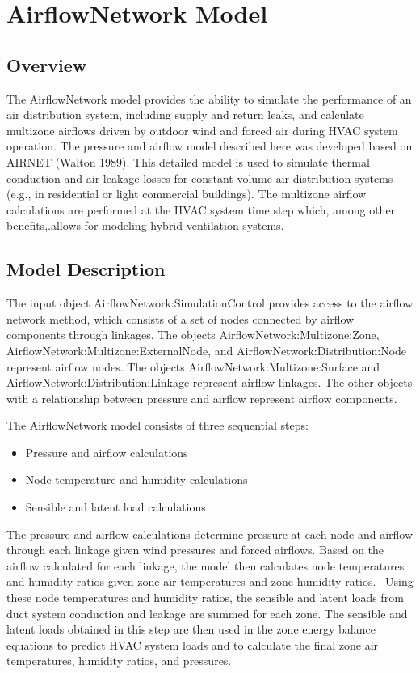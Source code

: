 \section{AirflowNetwork Model}\label{airflownetwork-model}

\subsection{Overview}\label{overview-004}

The AirflowNetwork model provides the ability to simulate the performance of an air distribution system, including supply and return leaks, and calculate multizone airflows driven by outdoor wind and forced air during HVAC system operation. The pressure and airflow model described here was developed based on AIRNET (Walton 1989). This detailed model is used to simulate thermal conduction and air leakage losses for constant volume air distribution systems (e.g., in residential or light commercial buildings). The multizone airflow calculations are performed at the HVAC system time step which, among other benefits,.allows for modeling hybrid ventilation systems.

\subsection{Model Description}\label{model-description-001}

The input object AirflowNetwork:SimulationControl provides access to the airflow network method, which consists of a set of nodes connected by airflow components through linkages. The objects AirflowNetwork:Multizone:Zone,~ AirflowNetwork:Multizone:ExternalNode, and AirflowNetwork:Distribution:Node represent airflow nodes. The objects AirflowNetwork:Multizone:Surface and AirflowNetwork:Distribution:Linkage represent airflow linkages. The other objects with a relationship between pressure and airflow represent airflow components.

The AirflowNetwork model consists of three sequential steps:

\begin{itemize}
\item
  Pressure and airflow calculations
\item
  Node temperature and humidity calculations
\item
  Sensible and latent load calculations
\end{itemize}

The pressure and airflow calculations determine pressure at each node and airflow through each linkage given wind pressures and forced airflows. Based on the airflow calculated for each linkage, the model then calculates node temperatures and humidity ratios given zone air temperatures and zone humidity ratios.~ Using these node temperatures and humidity ratios, the sensible and latent loads from duct system conduction and leakage are summed for each zone. The sensible and latent loads obtained in this step are then used in the zone energy balance equations to predict HVAC system loads and to calculate the final zone air temperatures, humidity ratios, and pressures.

